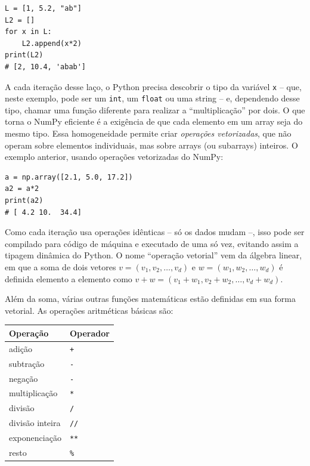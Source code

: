 \documentclass[11pt,a4paper]{article}
\begin{document}
\begin{lstlisting}
L = [1, 5.2, "ab"]
L2 = []
for x in L:
    L2.append(x*2)
print(L2)
# [2, 10.4, 'abab']
\end{lstlisting}

A cada iteração desse laço, o Python precisa descobrir o tipo da
variável \texttt{x} -- que, neste exemplo, pode ser um \texttt{int}, um
\texttt{float} ou uma string -- e, dependendo desse tipo, chamar uma
função diferente para realizar a ``multiplicação'' por dois. O que torna
o NumPy eficiente é a exigência de que cada elemento em um array seja do
mesmo tipo. Essa homogeneidade permite criar \emph{operações
vetorizadas}, que não operam sobre elementos individuais, mas sobre
arrays (ou subarrays) inteiros. O exemplo anterior, usando operações
vetorizadas do NumPy:

\begin{lstlisting}
a = np.array([2.1, 5.0, 17.2])
a2 = a*2
print(a2)
# [ 4.2 10.  34.4]
\end{lstlisting}

Como cada iteração usa operações idênticas -- só os dados mudam --, isso
pode ser compilado para código de máquina e executado de uma só vez,
evitando assim a tipagem dinâmica do Python. O nome ``operação vetorial''
vem da álgebra linear, em que a soma de dois vetores $v = (v_1, v_2,
\ldots, v_d)$ e $w = (w_1, w_2, \ldots, w_d)$ é definida elemento a
elemento como $v + w = (v_1+w_1, v_2+w_2, \ldots, v_d+w_d)$.

Além da soma, várias outras funções matemáticas estão definidas em sua
forma vetorial. As operações aritméticas básicas são:

\begin{center}
\begin{tabular}{ll}
\toprule
\textbf{Operação} & \textbf{Operador} \\
\midrule
adição & \texttt{+} \\
subtração & \texttt{-} \\
negação & \texttt{-} \\
multiplicação & \texttt{*} \\
divisão & \texttt{/} \\
divisão inteira & \texttt{//} \\
exponenciação & \texttt{**} \\
resto & \texttt{\%} \\
\bottomrule
\end{tabular}
\end{center}
\end{document}
